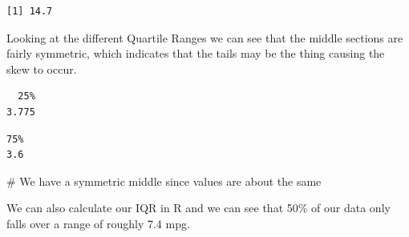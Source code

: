\documentclass[
  letterpaper,
  DIV=11,
  numbers=noendperiod]{scrreprt}
\newenvironment{Shaded}{\begin{snugshade}}{\end{snugshade}}
\newcommand{\CommentTok}[1]{\textcolor[rgb]{0.37,0.37,0.37}{#1}}
\newcommand{\DecValTok}[1]{\textcolor[rgb]{0.68,0.00,0.00}{#1}}
\newcommand{\FunctionTok}[1]{\textcolor[rgb]{0.28,0.35,0.67}{#1}}
\newcommand{\NormalTok}[1]{\textcolor[rgb]{0.00,0.23,0.31}{#1}}
\newcommand{\SpecialCharTok}[1]{\textcolor[rgb]{0.37,0.37,0.37}{#1}}
\begin{document}
\begin{verbatim}
[1] 14.7
\end{verbatim}

Looking at the different Quartile Ranges we can see that the middle
sections are fairly symmetric, which indicates that the tails may be the
thing causing the skew to occur.

\begin{Shaded}
\end{Shaded}

\begin{verbatim}
  25% 
3.775 
\end{verbatim}

\begin{Shaded}
\end{Shaded}

\begin{verbatim}
75% 
3.6 
\end{verbatim}

\begin{Shaded}
\begin{Highlighting}[]
\CommentTok{\# We have a symmetric middle since values are about the same}
\end{Highlighting}
\end{Shaded}

We can also calculate our IQR in R and we can see that 50\% of our data
only falls over a range of roughly 7.4 mpg.

\begin{Shaded}
\end{Shaded}
\end{document}
